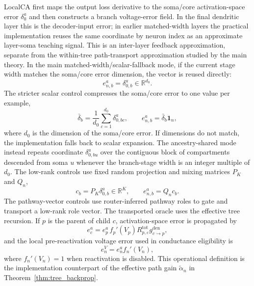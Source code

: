     LocalCA first maps the output loss derivative to the soma/core activation-space error $\delta_0^a$ and then constructs a branch voltage-error field. In the final dendritic layer this is the decoder-input error; in earlier matched-width layers the practical implementation reuses the same coordinate by neuron index as an approximate layer-soma teaching signal. This is an inter-layer feedback approximation, separate from the within-tree path-transport approximation studied by the main theory. In the main matched-width/scalar-fallback mode, if the current stage width matches the soma/core error dimension, the vector is reused directly:
    \[
    e_{n,b}^{a}=\delta_{0,b}^{a}\in\mathbb{R}^{d_0}.
    \]
    The stricter scalar control compresses the soma/core error to one value per example,
    \[
    \bar{\delta}_b=\frac{1}{d_0}\sum_{c=1}^{d_0}\delta_{0,bc}^{a},
    \qquad
    e_{n,b}^{a}=\bar{\delta}_b\mathbf{1}_n,
    \]
    where $d_0$ is the dimension of the soma/core error. If dimensions do not match, the implementation falls back to scalar expansion. The ancestry-shared mode instead repeats coordinate $\delta_{0,bu}^{a}$ over the contiguous block of compartments descended from soma $u$ whenever the branch-stage width is an integer multiple of $d_0$. The low-rank controls use fixed random projection and mixing matrices $P_K$ and $Q_n$,
    \[
    c_b=P_K\delta_{0,b}^{a}\in\mathbb{R}^{K},
    \qquad
    e_{n,b}^{a}=Q_n c_b.
    \]
    The pathway-vector controls use router-inferred pathway roles to gate and transport a low-rank role vector. The transported oracle uses the effective tree recursion. If $p$ is the parent of child $c$, activation-space error is propagated by
    \[
    e_{c}^{a}=e_{p}^{a}\, f_p'(V_p) R_{p,\varepsilon}^{\mathrm{tot}} g_{c\to p}^{\mathrm{den}},
    \]
    and the local pre-reactivation voltage error used in conductance eligibility is
    \[
    e_n^V=e_n^a f_n'(V_n),
    \]
    where $f_n'(V_n)=1$ when reactivation is disabled.
    This operational definition is the implementation counterpart of the effective path gain $\tilde{\alpha}_n$ in Theorem~\ref{thm:tree_backprop}.
    
